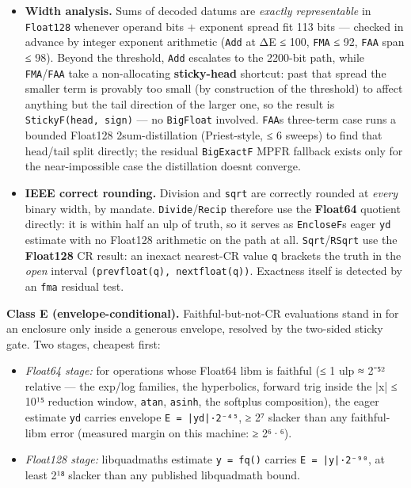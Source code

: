 \begin{itemize}
\item \textbf{Width analysis.} Sums of decoded datums are \emph{exactly representable} in \texttt{Float128} whenever operand bits + exponent spread fit 113 bits — checked in advance by integer exponent arithmetic (\texttt{Add} at ΔE ≤ 100, \texttt{FMA} ≤ 92, \texttt{FAA} span ≤ 98). Beyond the threshold, \texttt{Add} escalates to the 2200-bit path, while \texttt{FMA}/\texttt{FAA} take a non-allocating \textbf{sticky-head} shortcut: past that spread the smaller term is provably too small (by construction of the threshold) to affect anything but the tail direction of the larger one, so the result is \texttt{StickyF(head, sign)} — no \texttt{BigFloat} involved. \texttt{FAA}{\textquotesingle}s three-term case runs a bounded Float128 2sum-distillation (Priest-style, ≤ 6 sweeps) to find that head/tail split directly; the residual \texttt{BigExactF} MPFR fallback exists only for the near-impossible case the distillation doesn{\textquotesingle}t converge.


\item \textbf{IEEE correct rounding.} Division and \texttt{sqrt} are correctly rounded at \emph{every} binary width, by mandate. \texttt{Divide}/\texttt{Recip} therefore use the \textbf{Float64} quotient directly: it is within half an ulp of truth, so it serves as \texttt{EncloseF}{\textquotesingle}s eager \texttt{yd} estimate with no Float128 arithmetic on the path at all. \texttt{Sqrt}/\texttt{RSqrt} use the \textbf{Float128} CR result: an inexact nearest-CR value \texttt{q} brackets the truth in the \emph{open} interval \texttt{(prevfloat(q), nextfloat(q))}. Exactness itself is detected by an \texttt{fma} residual test.

\end{itemize}


\textbf{Class E (envelope-conditional).} Faithful-but-not-CR evaluations stand in for an enclosure only inside a generous envelope, resolved by the two-sided sticky gate. Two stages, cheapest first:



\begin{itemize}
\item \emph{Float64 stage:} for operations whose Float64 libm is faithful (≤ 1 ulp ≈ 2⁻⁵² relative — the exp/log families, the hyperbolics, forward trig inside the |x| ≤ 10¹⁵ reduction window, \texttt{atan}, \texttt{asinh}, the softplus composition), the eager estimate \texttt{yd} carries envelope \texttt{E = |yd|·2⁻⁴⁵}, ≥ 2⁷ slacker than any faithful-libm error (measured margin on this machine: ≥ 2⁶·⁶).


\item \emph{Float128 stage:} libquadmath{\textquotesingle}s estimate \texttt{y = fq()} carries \texttt{E = |y|·2⁻⁹⁰}, at least 2¹⁸ slacker than any published libquadmath bound.

\end{itemize}


